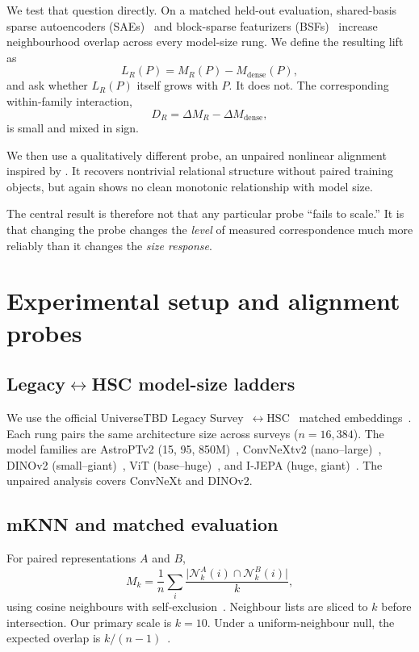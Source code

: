 \documentclass[11pt]{article}
\begin{document}
We test that question directly.
On a matched held-out evaluation, shared-basis sparse autoencoders (SAEs)~\citep{gao2025sae,lan2024saeuniversality} and block-sparse featurizers (BSFs)~\citep{fel2026bsf} increase neighbourhood overlap across every model-size rung.
We define the resulting lift as
\[
L_R(P)=M_R(P)-M_{\mathrm{dense}}(P),
\]
and ask whether \(L_R(P)\) itself grows with \(P\).
It does not.
The corresponding within-family interaction,
\[
D_R=\Delta M_R-\Delta M_{\mathrm{dense}},
\]
is small and mixed in sign.

We then use a qualitatively different probe, an unpaired nonlinear alignment inspired by \citet{jha2025vec2vec}.
It recovers nontrivial relational structure without paired training objects, but again shows no clean monotonic relationship with model size.

The central result is therefore not that any particular probe ``fails to scale.''
It is that changing the probe changes the \emph{level} of measured correspondence much more reliably than it changes the \emph{size response}.

\section{Experimental setup and alignment probes}
\label{sec:setup}

\subsection{Legacy\(\leftrightarrow\)HSC model-size ladders}

We use the official UniverseTBD Legacy Survey~\citep{dey2019legacy}\(\leftrightarrow\)HSC~\citep{miyazaki2018hsc} matched embeddings~\citep{duraphe2025platonicuniverse}.
Each rung pairs the same architecture size across surveys (\(n{=}16{,}384\)).
The model families are AstroPTv2 (15, 95, 850M)~\citep{smith2024astropt},
ConvNeXtv2 (nano--large)~\citep{woo2023convnextv2},
DINOv2 (small--giant)~\citep{oquab2024dinov2},
ViT (base--huge)~\citep{dosovitskiy2021vit},
and I-JEPA (huge, giant)~\citep{assran2023ijepa}.
The unpaired analysis covers ConvNeXt and DINOv2.

\subsection{mKNN and matched evaluation}

For paired representations \(A\) and \(B\),
\[
M_k=\frac{1}{n}\sum_i
\frac{\lvert \mathcal N_k^A(i)\cap \mathcal N_k^B(i)\rvert}{k},
\]
using cosine neighbours with self-exclusion~\citep{huh2024platonic,duraphe2025platonicuniverse}.
Neighbour lists are sliced to \(k\) before intersection.
Our primary scale is \(k{=}10\).
Under a uniform-neighbour null, the expected overlap is \(k/(n{-}1)\)~\citep{groger2026aristotelian}.
\end{document}
